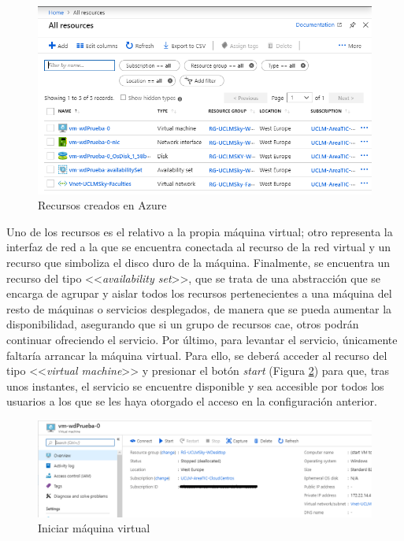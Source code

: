 \begin{figure}[h]
  \centering
  \includegraphics[width=0.8\linewidth]{figures/images/recursos_azure.PNG}
  \caption{Recursos creados en Azure}
  \label{fig:recursos_azure}
\end{figure}

Uno de los recursos es el relativo a la propia máquina virtual; otro representa la interfaz de red a la que se encuentra conectada al recurso de la red virtual y un recurso que simboliza el disco duro de la máquina. Finalmente, se encuentra un recurso del tipo <<\textit{availability set}>>, que se trata de una abstracción que se encarga de agrupar y aislar todos los recursos pertenecientes a una máquina del resto de máquinas o servicios desplegados, de manera que se pueda aumentar la disponibilidad, asegurando que si un grupo de recursos cae, otros podrán continuar ofreciendo el servicio. Por último, para levantar el servicio, únicamente faltaría arrancar la máquina virtual. Para ello, se deberá acceder al recurso del tipo <<\textit{virtual machine}>> y presionar el botón \textit{start} (Figura \ref{fig:iniciar_mv}) para que, tras unos instantes, el servicio se encuentre disponible y sea accesible por todos los usuarios a los que se les haya otorgado el acceso en la configuración anterior.

\begin{figure}[h]
  \centering
  \includegraphics[width=0.9\linewidth]{figures/images/iniciar_mv.PNG}
  \caption{Iniciar máquina virtual}
  \label{fig:iniciar_mv}
\end{figure}

